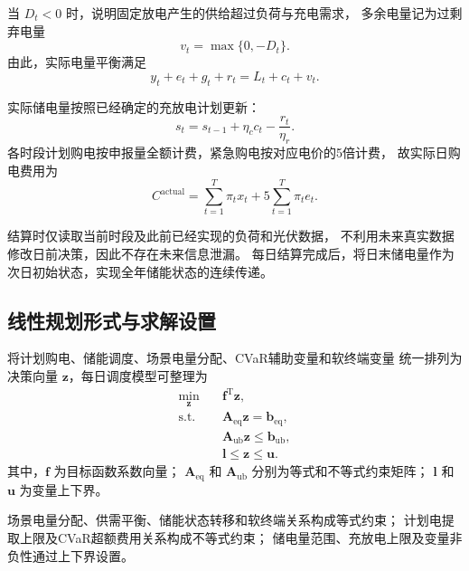 当 $D_t<0$ 时，说明固定放电产生的供给超过负荷与充电需求，
多余电量记为过剩弃电量
\begin{equation}
v_t=\max\{0,-D_t\}.
\label{eq:app_q2_supply_spill}
\end{equation}
由此，实际电量平衡满足
\begin{equation}
y_t+e_t+g_t+r_t
=
L_t+c_t+v_t .
\label{eq:app_q2_actual_balance}
\end{equation}

实际储电量按照已经确定的充放电计划更新：
\begin{equation}
s_t
=
s_{t-1}
+\eta_c c_t
-\frac{r_t}{\eta_r}.
\label{eq:app_q2_actual_soc}
\end{equation}
各时段计划购电按申报量全额计费，紧急购电按对应电价的5倍计费，
故实际日购电费用为
\begin{equation}
C^{\mathrm{actual}}
=
\sum_{t=1}^{T}\pi_t x_t
+
5\sum_{t=1}^{T}\pi_t e_t .
\label{eq:app_q2_actual_cost}
\end{equation}

结算时仅读取当前时段及此前已经实现的负荷和光伏数据，
不利用未来真实数据修改日前决策，因此不存在未来信息泄漏。
每日结算完成后，将日末储电量作为次日初始状态，实现全年储能状态的连续传递。

\subsection{线性规划形式与求解设置}

将计划购电、储能调度、场景电量分配、CVaR辅助变量和软终端变量
统一排列为决策向量 $\boldsymbol z$，每日调度模型可整理为
\begin{equation}
\begin{aligned}
\min_{\boldsymbol z}\quad
&\boldsymbol f^{\mathrm T}\boldsymbol z,\\
\mathrm{s.t.}\quad
&\boldsymbol A_{\mathrm{eq}}\boldsymbol z
=\boldsymbol b_{\mathrm{eq}},\\
&\boldsymbol A_{\mathrm{ub}}\boldsymbol z
\leq\boldsymbol b_{\mathrm{ub}},\\
&\boldsymbol l\leq\boldsymbol z\leq\boldsymbol u .
\end{aligned}
\label{eq:q2_standard_lp}
\end{equation}
其中，$\boldsymbol f$ 为目标函数系数向量；
$\boldsymbol A_{\mathrm{eq}}$ 和 $\boldsymbol A_{\mathrm{ub}}$
分别为等式和不等式约束矩阵；
$\boldsymbol l$ 和 $\boldsymbol u$ 为变量上下界。

场景电量分配、供需平衡、储能状态转移和软终端关系构成等式约束；
计划电提取上限及CVaR超额费用关系构成不等式约束；
储电量范围、充放电上限及变量非负性通过上下界设置。

